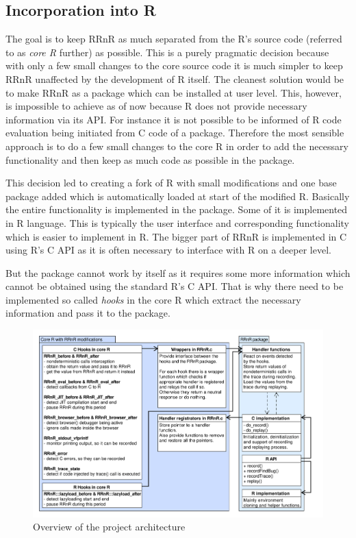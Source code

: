\documentclass[thesis=M,english,hidelinks]{FITthesis}[2012/10/20]
\begin{document}
		\subsection{Incorporation into R}
		The goal is to keep RRnR as much separated from the R's source code (referred to as \emph{core R} further) as possible. This is a purely pragmatic decision because with only a few small changes to the core source code it is much simpler to keep RRnR unaffected by the development of R itself. The cleanest solution would be to make RRnR as a package which can be installed at user level. This, however, is impossible to achieve as of now because R does not provide necessary information via its API. For instance it is not possible to be informed of R code evaluation being initiated from C code of a package. Therefore the most sensible approach is to do a few small changes to the core R in order to add the necessary functionality and then keep as much code as possible in the package.\par
		
		This decision led to creating a fork of R with small modifications and one base package added which is automatically loaded at start of the modified R. Basically the entire functionality is implemented in the package. Some of it is implemented in R language. This is typically the user interface and corresponding functionality which is easier to implement in R. The bigger part of RRnR is implemented in C using R's C API as it is often necessary to interface with R on a deeper level.\par
		
		But the package cannot work by itself as it requires some more information which cannot be obtained using the standard R's C API. That is why there need to be implemented so called \emph{hooks} in the core R which extract the necessary information and pass it to the package.\par
		
		\begin{figure}[ht]\centering
			\includegraphics[width=1.0\textwidth]{img/incorporation_into_r2}
			\caption{Overview of the project architecture}\label{fig:incorporation_into_r2}
		\end{figure}
		
\end{document}
